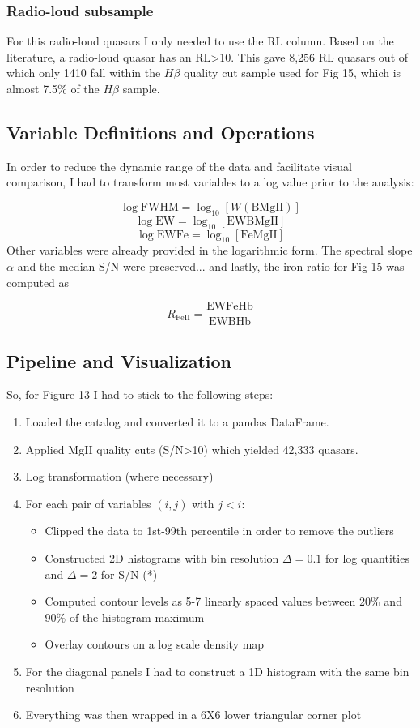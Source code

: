 \documentclass[11pt,a4paper]{article}
\begin{document}
\subsubsection{Radio-loud subsample}

For this radio-loud quasars I only needed to use the RL column. Based on the literature, a radio-loud quasar has an RL>10. This gave 8,256 RL quasars out of which only 1410 fall within the $H \beta$ quality cut sample used for Fig 15, which is almost 7.5\% of the $H \beta$ sample.

\subsection{Variable Definitions and Operations}

In order to reduce the dynamic range of the data and facilitate visual comparison, I had to transform most variables to a log value prior to the analysis: 

$$\log\text{FWHM} = \log_{10}[W(\text{BMgII})]$$
$$\log\text{EW} = \log_{10}[\text{EWBMgII}]$$
$$\log\text{EWFe} = \log_{10}[\text{FeMgII}]$$
Other variables were already provided in the logarithmic form. The spectral slope $\alpha$ and the median S/N were preserved... and lastly, the iron ratio for Fig 15 was computed as

$$R_\text{FeII} = \frac{\text{EWFeHb}}{\text{EWBHb}}$$

\subsection{Pipeline and Visualization}

So, for Figure 13 I had to stick to the following steps: 

\begin{enumerate}
    \item Loaded the catalog and converted it to a pandas DataFrame.
    \item Applied MgII quality cuts (S/N>10) which yielded 42,333 quasars.
    \item Log transformation (where necessary) 
    \item  For each pair of variables $(i,j)$ with $j<i$:
    \begin{itemize}
        \item Clipped the data to 1st-99th percentile in order to remove the outliers
        \item Constructed 2D histograms with bin resolution $\Delta=0.1$ for log quantities and  $\Delta=2$ for S/N (*)
        \item Computed contour levels as 5-7 linearly spaced values between 20\% and 90\% of the histogram maximum
        \item Overlay contours on a log scale density map
    \end{itemize}
    \item For the diagonal panels I had to construct a 1D histogram with the same bin resolution
    \item Everything was then wrapped in a 6X6 lower triangular corner plot
\end{enumerate}
\end{document}
